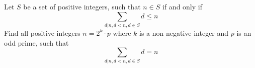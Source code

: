 Let $S$ be a set of positive integers, such that $n \in S$ if and only if $$\sum_{d|n,d<n,d \in S} d \le n$$Find all positive integers $n=2^k \cdot p$ where $k$ is a non-negative integer and $p$ is an odd prime, such that $$\sum_{d|n,d<n,d \in S} d = n$$